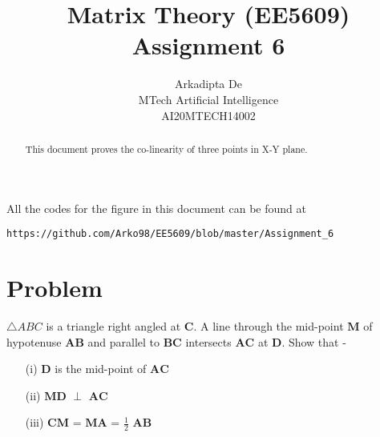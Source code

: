 \documentclass[journal,12pt,twocolumn]{IEEEtran}
\begin{document}
\makeatletter
{}
\makeatother
\let\StandardTheFigure\thefigure
\let\vec\mathbf
\renewcommand{\thefigure}{\theproblem}
\def\putbox#1#2#3{\makebox[0in][l]{\makebox[#1][l]{}\raisebox{\baselineskip}[0in][0in]{\raisebox{#2}[0in][0in]{#3}}}}
     \def\rightbox#1{\makebox[0in][r]{#1}}
     \def\centbox#1{\makebox[0in]{#1}}
     \def\topbox#1{\raisebox{-\baselineskip}[0in][0in]{#1}}
     \def\midbox#1{\raisebox{-0.5\baselineskip}[0in][0in]{#1}}
\vspace{3cm}
\title{Matrix Theory (EE5609) Assignment 6}
\author{Arkadipta De\\MTech Artificial Intelligence\\AI20MTECH14002}

\maketitle
\newpage
\bigskip
\renewcommand{\thefigure}{\theenumi}
\renewcommand{\thetable}{\theenumi}

\begin{abstract}
This document proves the co-linearity of three points in X-Y plane.
\end{abstract}

All the codes for the figure in this document can be found at
\begin{lstlisting}
https://github.com/Arko98/EE5609/blob/master/Assignment_6
\end{lstlisting}

\section{Problem}
$\triangle{ABC}$ is a triangle right angled at $\vec{C}$. A line through the mid-point $\vec{M}$ of hypotenuse $\vec{AB}$ and parallel to $\vec{BC}$ intersects $\vec{AC}$ at $\vec{D}$. Show that -
\begin{itemize}
\item[(i)] $\vec{D}$ is the mid-point of $\vec{AC}$ 
\item[(ii)] $\vec{MD}$ $\perp$ $\vec{AC}$   
\item[(iii)] $\vec{CM}$ = $\vec{MA}$ = $\frac{1}{2}$ $\vec{AB}$
\end{itemize}
\end{document}
